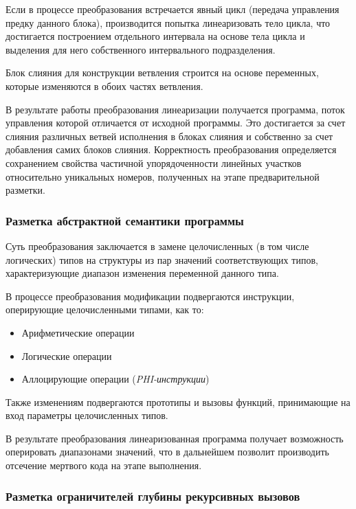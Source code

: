 \documentclass[12pt,a4paper]{article}
\begin{document}
Если в процессе преобразования встречается явный цикл (передача управления предку данного блока), производится попытка линеаризовать тело цикла, что достигается построением отдельного интервала на основе тела цикла и выделения для него собственного интервального подразделения.

Блок слияния для конструкции ветвления строится на основе переменных, которые изменяются в обоих частях ветвления.

В результате работы преобразования линеаризации получается программа, поток управления которой отличается от исходной программы. Это достигается за счет слияния различных ветвей исполнения в блоках слияния и собственно за счет добавления самих блоков слияния. Корректность преобразования определяется сохранением свойства частичной упорядоченности линейных участков относительно уникальных номеров, полученных на этапе предварительной разметки.

\subsubsection{Разметка абстрактной семантики программы}

Суть преобразования заключается в замене целочисленных (в том числе логических) типов на структуры из пар значений соответствующих типов, характеризующие диапазон изменения переменной данного типа.

В процессе преобразования модификации подвергаются инструкции, оперирующие целочисленными типами, как то:
\begin{itemize}
    \item Арифметические операции
    \item Логические операции
    \item Аллоцирующие операции (\textit{PHI-инструкции})
\end{itemize}

Также изменениям подвергаются прототипы и вызовы функций, принимающие на вход параметры целочисленных типов.

В результате преобразования линеаризованная программа получает возможность оперировать диапазонами значений, что в дальнейшем позволит производить отсечение мертвого кода на этапе выполнения.

\subsubsection{Разметка ограничителей глубины рекурсивных вызовов}
\end{document}
